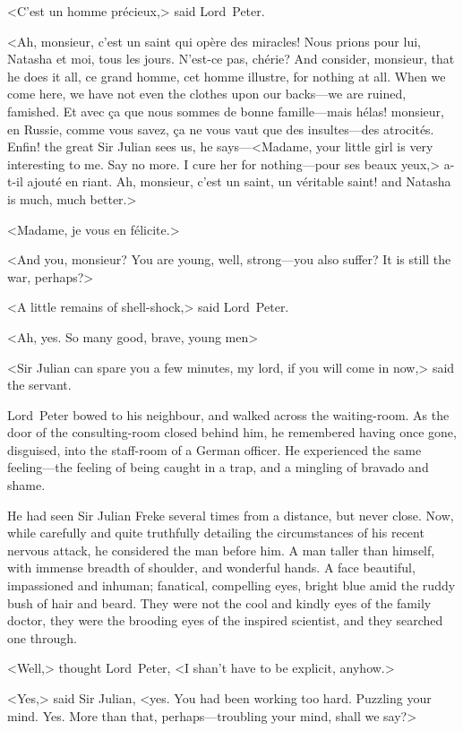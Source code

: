 <C'est un homme précieux,> said Lord~Peter.

<Ah, monsieur, c'est un saint qui opère des miracles! Nous prions pour lui, Natasha et moi, tous les jours. N'est-ce pas, chérie? And consider, monsieur, that he does it all, ce grand homme, cet homme illustre, for nothing at all. When we come here, we have not even the clothes upon our backs—we are ruined, famished. Et avec ça que nous sommes de bonne famille—mais hélas! monsieur, en Russie, comme vous savez, ça ne vous vaut que des insultes—des atrocités. Enfin! the great Sir Julian sees us, he says—<Madame, your little girl is very interesting to me. Say no more. I cure her for nothing—pour ses beaux yeux,> a-t-il ajouté en riant. Ah, monsieur, c'est un saint, un véritable saint! and Natasha is much, much better.>

<Madame, je vous en félicite.>

<And you, monsieur? You are young, well, strong—you also suffer? It is still the war, perhaps?>

<A little remains of shell-shock,> said Lord~Peter.

<Ah, yes. So many good, brave, young men\longdash>

<Sir Julian can spare you a few minutes, my lord, if you will come in now,> said the servant.

Lord~Peter bowed to his neighbour, and walked across the waiting-room. As the door of the consulting-room closed behind him, he remembered having once gone, disguised, into the staff-room of a German officer. He experienced the same feeling—the feeling of being caught in a trap, and a mingling of bravado and shame.

He had seen Sir Julian Freke several times from a distance, but never close. Now, while carefully and quite truthfully detailing the circumstances of his recent nervous attack, he considered the man before him. A man taller than himself, with immense breadth of shoulder, and wonderful hands. A face beautiful, impassioned and inhuman; fanatical, compelling eyes, bright blue amid the ruddy bush of hair and beard. They were not the cool and kindly eyes of the family doctor, they were the brooding eyes of the inspired scientist, and they searched one through.

<Well,> thought Lord~Peter, <I shan't have to be explicit, anyhow.>

<Yes,> said Sir Julian, <yes. You had been working too hard. Puzzling your mind. Yes. More than that, perhaps—troubling your mind, shall we say?>

